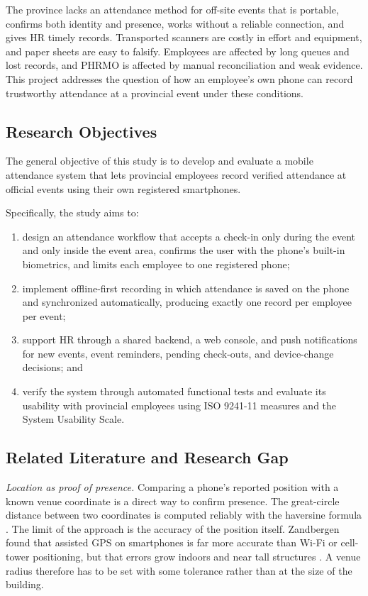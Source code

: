 \documentclass[conference]{IEEEtran}
\begin{document}
The province lacks an attendance method for off-site events that is
portable, confirms both identity and presence, works without a reliable
connection, and gives HR timely records. Transported scanners are
costly in effort and equipment, and paper sheets are easy to falsify.
Employees are affected by long queues and lost records, and PHRMO is
affected by manual reconciliation and weak evidence. This project
addresses the question of how an employee's own phone can record
trustworthy attendance at a provincial event under these conditions.

\subsection{Research Objectives}

The general objective of this study is to develop and evaluate a mobile
attendance system that lets provincial employees record verified
attendance at official events using their own registered smartphones.

Specifically, the study aims to:
\begin{enumerate}
    \item design an attendance workflow that accepts a check-in only
    during the event and only inside the event area, confirms the user
    with the phone's built-in biometrics, and limits each employee to
    one registered phone;
    \item implement offline-first recording in which attendance is saved
    on the phone and synchronized automatically, producing exactly one
    record per employee per event;
    \item support HR through a shared backend, a web console, and push
    notifications for new events, event reminders, pending check-outs,
    and device-change decisions; and
    \item verify the system through automated functional tests and
    evaluate its usability with provincial employees using ISO 9241-11
    measures and the System Usability Scale.
\end{enumerate}

\subsection{Related Literature and Research Gap}

\textit{Location as proof of presence.}
Comparing a phone's reported position with a known venue coordinate is
a direct way to confirm presence. The great-circle distance between two
coordinates is computed reliably with the haversine formula
\cite{sinnott1984haversine}. The limit of the approach is the accuracy of
the position itself. Zandbergen found that assisted GPS on smartphones
is far more accurate than Wi-Fi or cell-tower positioning, but that
errors grow indoors and near tall structures
\cite{zandbergen2009accuracy}. A venue radius therefore has to be set
with some tolerance rather than at the size of the building.
\end{document}
